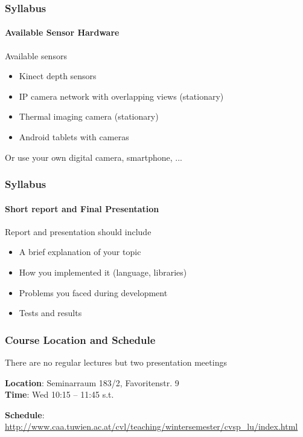 \documentclass[xetex,professionalfont]{beamer}
\begin{document}

\begin{frame}
\frametitle{Syllabus}
\framesubtitle{Available Sensor Hardware}

Available sensors
\begin{itemize}
	\item Kinect depth sensors
	\item IP camera network with overlapping views (stationary)
	\item Thermal imaging camera (stationary)
	\item Android tablets with cameras
\end{itemize}

\bigskip
Or use your own digital camera, smartphone, ...

\end{frame}


\begin{frame}
\frametitle{Syllabus}
\framesubtitle{Short report and Final Presentation}

Report and presentation should include
\begin{itemize} 
	\item A brief explanation of your topic
	\item How you implemented it (language, libraries)
	\item Problems you faced during development
	\item Tests and results
\end{itemize}

\end{frame}


\begin{frame}
\frametitle{Course Location and Schedule}

There are no regular lectures but two presentation meetings

\bigskip
\textbf{Location}: Seminarraum 183/2, Favoritenstr. 9\\
\textbf{Time}: Wed 10:15 -- 11:45 s.t.

\bigskip
\textbf{Schedule}: \url{http://www.caa.tuwien.ac.at/cvl/teaching/wintersemester/cvsp_lu/index.html}

\end{frame}
\end{document}
